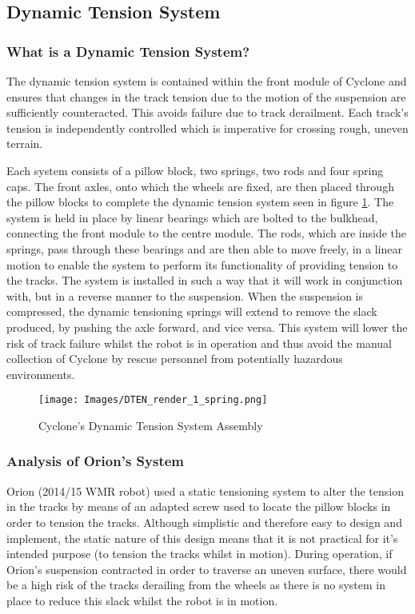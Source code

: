 \subsection{Dynamic Tension System}
\subsubsection{What is a Dynamic Tension System?}
The dynamic tension system is contained within the front module of Cyclone and ensures that changes in the track tension due to the motion of the suspension are sufficiently counteracted. This  avoids failure due to track derailment. Each track’s tension is independently controlled which is imperative for crossing rough, uneven terrain. \par
Each system consists of a pillow block, two springs, two rods and four spring caps. The front axles, onto which the wheels are fixed, are then placed through the pillow blocks to complete the dynamic tension system seen in figure \ref{fig:DTEN}. The system is held in place by linear bearings which are bolted to the bulkhead, connecting the front module to the centre module. The rods, which are inside the springs, pass through these bearings and are then able to move freely, in a linear motion to enable the system to perform its functionality of providing tension to the tracks. The system is installed in such a way that it will work in conjunction with, but in a reverse manner to  the suspension. When the suspension is compressed, the dynamic tensioning springs will extend to remove the slack produced, by pushing the axle forward, and vice versa. This system will lower the risk of track failure whilst the robot is in operation and thus avoid the manual collection of Cyclone by rescue personnel from potentially hazardous environments. \par
\begin{figure}[h]
\centering\texttt{[image: Images/DTEN\_render\_1\_spring.png]}
\caption{Cyclone's Dynamic Tension System Assembly}
\label{fig:DTEN}
\end{figure}
\subsubsection{Analysis of Orion's System}
Orion (2014/15 WMR robot) used a static tensioning system  to alter the tension in the tracks by means of an adapted screw used to locate the pillow blocks in order to tension the tracks. Although simplistic and therefore easy to design and implement, the static nature of this design means that it is not practical for it’s intended purpose (to tension the tracks whilst in motion). During operation, if Orion’s suspension contracted in order to traverse an uneven surface, there would be a high risk of the tracks derailing from the wheels as there is no system in place to reduce this slack whilst the robot is in motion. \par
